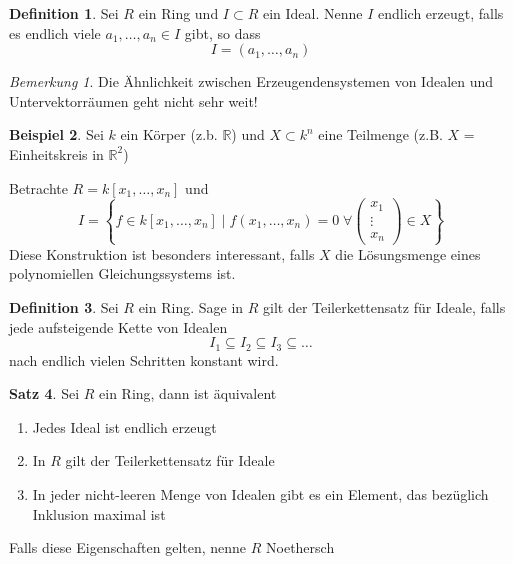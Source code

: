 \documentclass[12pt,parskip=full]{scrartcl}
\newcommand{\setR}{\mathbb{R}}
\theoremstyle{definition}
\newtheorem{theorem}{Satz}[section]
\newtheorem{definition}[theorem]{Definition}
\newtheorem{example}[theorem]{Beispiel}
\theoremstyle{remark}
\newtheorem*{remark}{Bemerkung}
\begin{document}
	\begin{definition}
		Sei $R$ ein Ring und $I \subset R$ ein Ideal. Nenne $I$ endlich erzeugt, falls es endlich viele $a_1, \dots, a_n \in I$ gibt, so dass
		\begin{equation*}
			I = (a_1, \dots, a_n)
		\end{equation*}
	\end{definition}

	\begin{remark}
		Die Ähnlichkeit zwischen Erzeugendensystemen von Idealen und Untervektorräumen geht nicht sehr weit!
	\end{remark}

	\begin{example}
		Sei $k$ ein Körper (z.b. $\setR$) und $X \subset k^n$ eine Teilmenge (z.B. $X$ = Einheitskreis in $\setR^2$)
		
		Betrachte $R = k[x_1, \dots, x_n]$ und
		\begin{equation*}
			I = \left\{ f \in k[x_1, \dots, x_n] \mid f(x_1, \dots, x_n) = 0 \;\forall \begin{pmatrix}
				x_1 \\ \vdots \\ x_n
			\end{pmatrix} \in X \right\}
		\end{equation*}
		Diese Konstruktion ist besonders interessant, falls $X$ die Lösungsmenge eines polynomiellen Gleichungssystems ist.
	\end{example}

	\begin{definition}
		Sei $R$ ein Ring. Sage in $R$ gilt der Teilerkettensatz für Ideale, falls jede aufsteigende Kette von Idealen
		\begin{equation*}
			I_1 \subseteq I_2 \subseteq I_3 \subseteq \dots
		\end{equation*}
		nach endlich vielen Schritten konstant wird.
	\end{definition}

	\begin{theorem}
		Sei $R$ ein Ring, dann ist äquivalent
		\begin{enumerate}
			\item Jedes Ideal ist endlich erzeugt
			\item In $R$ gilt der Teilerkettensatz für Ideale
			\item In jeder nicht-leeren Menge von Idealen gibt es ein Element, das bezüglich Inklusion maximal ist
		\end{enumerate}
		Falls diese Eigenschaften gelten, nenne $R$ Noethersch
	\end{theorem}
\end{document}
